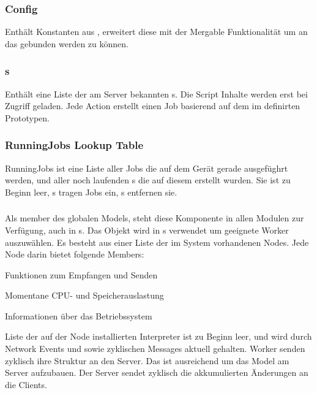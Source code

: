 \begin{multicols}{2}

\subsubsection{Config}
Enthält Konstanten aus , erweitert diese mit der Mergable Funktionalität um an das \UI{} gebunden werden zu können.

\subsubsection{\jobScript s}
Enthält eine Liste der am Server bekannten \jobScript s. Die Script Inhalte werden erst bei Zugriff geladen.
Jede \UI{} Action erstellt einen Job basierend auf dem im \jobScript{} definirten Prototypen.

\subsubsection{RunningJobs Lookup Table}
RunningJobs ist eine Liste aller Jobs die auf dem Gerät gerade ausgefüghrt werden, und aller noch laufenden \remoteJob s die auf diesem erstellt wurden.
Sie ist zu Beginn leer, \TransCall s tragen Jobs ein, \TransReturn s entfernen sie.

\subsubsection{\netInfo{}}
\label{netInfo}
Als member des globalen Models, steht diese Komponente in allen Modulen zur Verfügung, auch in \jobScript s.
Das \netInfo{} Objekt wird in \jobScript s verwendet um geeignete Worker auszuwählen.
Es besteht aus einer Liste der im System vorhandenen Nodes.
Jede Node darin bietet folgende Members:
\BCL
  \setlength\itemsep{0.0em}
  \item Funktionen zum Empfangen und Senden
  \item Momentane CPU- und Speicherauslastung
  \item Informationen über das Betriebssystem
  \item Liste der auf der Node installierten Interpreter
\ECL
\noindent \netInfo{} ist zu Beginn leer, und wird durch Network Events  und  sowie zyklischen Messages aktuell gehalten.
Worker senden zyklisch ihre \netInfo{} Struktur an den Server.
Das ist ausreichend um das \netInfo{} Model am Server aufzubauen.
Der Server sendet zyklisch die akkumulierten Änderungen an die Clients.



\end{multicols}
